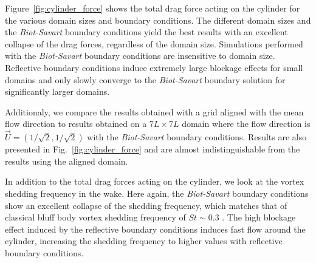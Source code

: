 \documentclass[preprint,12pt]{elsarticle}
\begin{document}
Figure~\ref{fig:cylinder_force} shows the total drag force acting on the cylinder for the various domain sizes and boundary conditions. The different domain sizes and the \emph{Biot-Savart} boundary conditions yield the best results with an excellent collapse of the drag forces, regardless of the domain size. Simulations performed with the \emph{Biot-Savart} boundary conditions are insensitive to domain size. Reflective boundary conditions induce extremely large blockage effects for small domains and only slowly converge to the \emph{Biot-Savart} boundary solution for significantly larger domains.

Additionaly, we compare the results obtained with a grid aligned with the mean flow direction to results obtained on a $7L\times 7L$ domain where the flow direction is $\vec{U}=(1/\sqrt{2},1/\sqrt{2})$ with the \emph{Biot-Savart} boundary conditions. Results are also presented in Fig.~\ref{fig:cylinder_force} and are almost indistinguishable from the results using the aligned domain.


In addition to the total drag forces acting on the cylinder, we look at the vortex shedding frequency in the wake. Here again, the \emph{Biot-Savart} boundary conditions show an excellent collapse of the shedding frequency, which matches that of classical bluff body vortex shedding frequency of $St\sim 0.3$ \cite{}. The high blockage effect induced by the reflective boundary conditions induces fast flow around the cylinder, increasing the shedding frequency to higher values with reflective boundary conditions.
\end{document}
